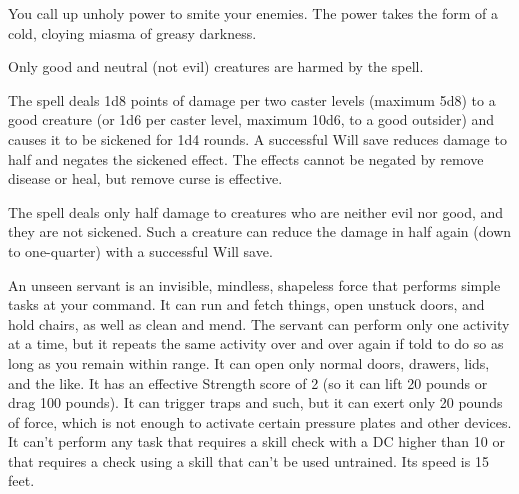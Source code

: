 \begin{multicols}{2}
\begin{small}
\noindent You call up unholy power to smite your enemies. The power takes the form of a cold, cloying miasma of greasy darkness.

\smallskip\noindent Only good and neutral (not evil) creatures are harmed by the spell.

\smallskip\noindent The spell deals 1d8 points of damage per two caster levels (maximum 5d8) to a good creature (or 1d6 per caster level, maximum 10d6, to a good outsider) and causes it to be sickened for 1d4 rounds. A successful Will save reduces damage to half and negates the sickened effect. The effects cannot be negated by remove disease or heal, but remove curse is effective.

\smallskip\noindent The spell deals only half damage to creatures who are neither evil nor good, and they are not sickened. Such a creature can reduce the damage in half again (down to one-quarter) with a successful Will save.

\noindent An unseen servant is an invisible, mindless, shapeless force that performs simple tasks at your command. It can run and fetch things, open unstuck doors, and hold chairs, as well as clean and mend. The servant can perform only one activity at a time, but it repeats the same activity over and over again if told to do so as long as you remain within range. It can open only normal doors, drawers, lids, and the like. It has an effective Strength score of 2 (so it can lift 20 pounds or drag 100 pounds). It can trigger traps and such, but it can exert only 20 pounds of force, which is not enough to activate certain pressure plates and other devices. It can't perform any task that requires a skill check with a DC higher than 10 or that requires a check using a skill that can't be used untrained. Its speed is 15 feet.


\end{small}
\end{multicols}
